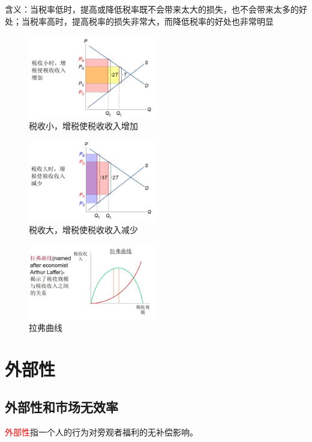 \documentclass[12pt, a4paper]{article}
\begin{document}
含义：当税率低时，提高或降低税率既不会带来太大的损失，也不会带来太多的好处；当税率高时，提高税率的损失非常大，而降低税率的好处也非常明显
\begin{figure}[H] 
  \centering %
  \includegraphics[width=0.5\textwidth]{税收小.png} 
  \caption{税收小，增税使税收收入增加} %
\end{figure}
\begin{figure}[H] 
  \centering %
  \includegraphics[width=0.5\textwidth]{税收大.png} 
  \caption{税收大，增税使税收收入减少} %
\end{figure}
\begin{figure}[H] 
  \centering %
  \includegraphics[width=0.5\textwidth]{拉弗曲线.png} 
  \caption{拉弗曲线} %
\end{figure}

\newpage
\section{外部性}

\subsection{外部性和市场无效率}
\textcolor{red}{外部性}指一个人的行为对旁观者福利的无补偿影响。
\end{document}
